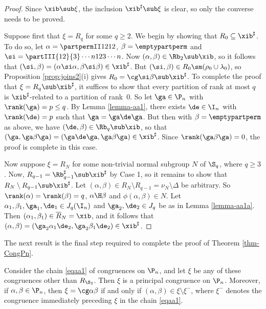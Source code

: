 \begin{proof}
Since $\xib\sub\xi$, the inclusion $\xib^\sharp\sub\xi$ is clear, so only the converse needs to be proved.

\bigskip{} Suppose first that $\xi=R_q$ for some $q\geq 2$.  We begin by showing that $R_0\subseteq \xib^\sharp$.  To do so, let $\alpha=\partpermII1212$, $\beta=\emptypartperm$ and $\si=\partIII{12}{3}\cdots{n}{12}{3}\cdots{n}$.  Now $(\alpha,\beta)\in\Rb_2\sub\xib$, so it follows that $(\si,\beta)=(\alpha\si\alpha,\beta\si\beta)\in\xib^\sharp$.  But $(\si,\beta)\in R_0\sm(\rho_0\cup\lambda_0)$, so Proposition \ref{prop:joins2}(i) gives $R_0=\cg\si\beta\sub\xib^\sharp$.  To complete the proof that $\xi=R_q\sub\xib^\sharp$, it suffices to show that every partition of rank at most $q$ is $\xib^\sharp$-related to a partition of rank~$0$.  So let $\ga\in\P_n$ with $\rank(\ga)=p\leq q$.  By Lemma \ref{lemma-aa1}, there exists $\de\in\I_n$ with $\rank(\de)=p$ such that $\ga=\ga\de\ga$.  But then with $\beta=\emptypartperm$ as above, we have $(\de,\beta)\in\Rb_q\sub\xib$, so that $(\ga,\ga\beta\ga)=(\ga\de\ga,\ga\beta\ga)\in\xib^\sharp$.  Since $\rank(\ga\beta\ga)=0$, the proof is complete in this case.

\bigskip{}  Now suppose $\xi=R_N$ for some non-trivial normal subgroup $N$ of $\S_q$, where $q\geq3$.  Now, $R_{q-1}=\Rb_{q-1}^\sharp\sub\xib^\sharp$ by Case 1, so it remains to show that $R_N\setminus R_{q-1}\sub\xib^\sharp$.
Let $(\alpha,\beta)\in R_N\setminus R_{q-1}=\nu_N\setminus \Delta$ be arbitrary.  So $\rank(\alpha)=\rank(\beta)=q$, $\alpha\H\beta$ and $\phi(\alpha,\beta)\in N$.  Let $\alpha_1,\beta_1,\ga_1,\de_1\in J_q(\I_n)$ and $\ga_2,\de_2\in J_q$ be as in Lemma \ref{lemma-aa1a}.  Then $(\alpha_1,\beta_1)\in \overline{R}_N=\xib$, and it follows that $(\alpha,\beta)=(\ga_2\alpha_1\de_2,\ga_2\beta_1\de_2)\in\xib^\sharp$. \end{proof}

The next result is the final step required to complete the proof of Theorem \ref{thm-CongPn}.

%
\begin{proposition}
\label{prop-aa3}
Consider the chain \eqref{eqaa1} of congruences on $\P_n$, and let $\xi$ be any of these congruences other than $R_{\S_2}$. Then $\xi$ is a principal congruence on $\P_n$.  Moreover, if $\alpha,\beta\in\P_n$, then $\xi=\cg\alpha\beta$ if and only if $(\alpha,\beta)\in\xi\setminus\xi^-$, where $\xi^-$ denotes the congruence immediately preceding $\xi$ in the chain \eqref{eqaa1}.
\end{proposition}

